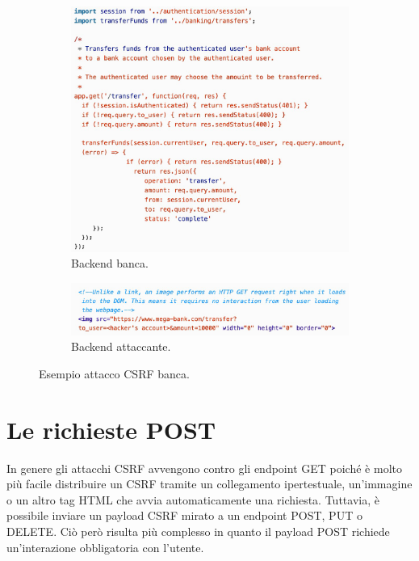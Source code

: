 \begin{figure}[H]
	\begin{subfigure}{1\textwidth}
		\centering
		\includegraphics[width=12cm]{capitoli/web_security/imgs/csrf_banca_1.png}  
		\caption{Backend banca.}
		\label{fig:csrf_banca_1}
	\end{subfigure}
	
	\vspace{1.5em}
		
	\begin{subfigure}{1\textwidth}
		\centering
		\includegraphics[width=12cm]{capitoli/web_security/imgs/csrf_banca_2.png}  
		\caption{Backend attaccante.}
		\label{fig:csrf_banca_2}
	\end{subfigure}
	\caption{Esempio attacco CSRF banca.}
	\label{fig:csrf_banca}
\end{figure}

\newpage

\section{Le richieste POST}

In genere gli attacchi CSRF avvengono contro gli endpoint GET poiché è molto più facile distribuire un CSRF tramite un collegamento ipertestuale, un'immagine o un altro tag HTML che avvia automaticamente una richiesta. Tuttavia, è possibile inviare un payload CSRF mirato a un endpoint POST, PUT o DELETE. Ciò però risulta più complesso in quanto il payload POST richiede un'interazione obbligatoria con l'utente.\\

